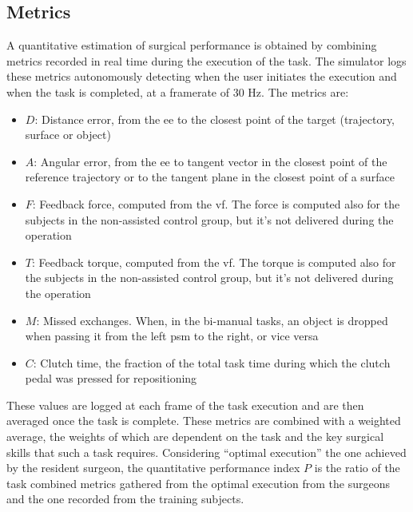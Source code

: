 \documentclass{article}
\begin{document}
\begin{multicols}{2}
\subsection{Metrics}
A quantitative estimation of surgical performance is obtained by combining metrics recorded in real time during the execution of the task. The simulator logs these metrics autonomously detecting when the user initiates the execution and when the task is completed, at a framerate of 30 Hz. The metrics are:
\begin{itemize}
  \item $D$: Distance error, from the \ac{ee} to the closest point of the target (trajectory, surface or object)
  \item $A$: Angular error, from the \ac{ee} to tangent vector in the closest point of the reference trajectory or to the tangent plane in the closest point of a surface
  \item $F$: Feedback force, computed from the \ac{vf}. The force is computed also for the subjects in the non-assisted control group, but it's not delivered during the operation
  \item $T$: Feedback torque, computed from the \ac{vf}. The torque is computed also for the subjects in the non-assisted control group, but it's not delivered during the operation
  \item $M$: Missed exchanges. When, in the bi-manual tasks, an object is dropped when passing it from the left \ac{psm} to the right, or vice versa
  \item $C$: Clutch time, the fraction of the total task time during which the clutch pedal was pressed for repositioning
\end{itemize} 
These values are logged at each frame of the task execution and are then averaged once the task is complete. These metrics are combined with a weighted average, the weights of which are dependent on the task and the key surgical skills that such a task requires. 
\newline
Considering ``optimal execution'' the one achieved by the resident surgeon, the quantitative performance index $P$ is the ratio of the task combined metrics gathered from the optimal execution from the surgeons and the one recorded from the training subjects. 

\end{multicols}
\end{document}
